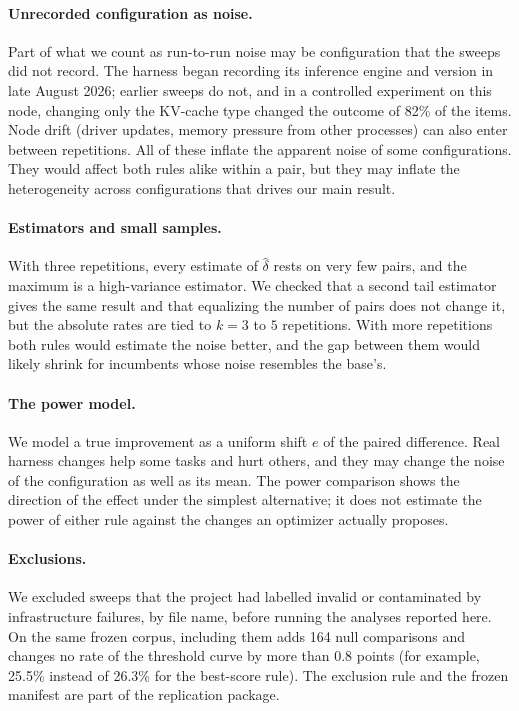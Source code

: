 \paragraph{Unrecorded configuration as noise.}
Part of what we count as run-to-run noise may be configuration that the sweeps
did not record. The harness began recording its inference engine and version in
late August 2026; earlier sweeps do not, and in a controlled experiment on this
node, changing only the KV-cache type changed the outcome of 82\% of the items.
Node drift (driver updates, memory pressure from other processes) can also enter
between repetitions. All of these inflate the apparent noise of some
configurations. They would affect both rules alike within a pair, but they may
inflate the heterogeneity across configurations that drives our main result.

\paragraph{Estimators and small samples.}
With three repetitions, every estimate of $\hat\delta$ rests on very few pairs,
and the maximum is a high-variance estimator. We checked that a second tail
estimator gives the same result and that equalizing the number of pairs does not
change it, but the absolute rates are tied to $k = 3$ to $5$ repetitions. With
more repetitions both rules would estimate the noise better, and the gap between
them would likely shrink for incumbents whose noise resembles the base's.

\paragraph{The power model.}
We model a true improvement as a uniform shift $e$ of the paired difference.
Real harness changes help some tasks and hurt others, and they may change the
noise of the configuration as well as its mean. The power comparison shows the
direction of the effect under the simplest alternative; it does not estimate the
power of either rule against the changes an optimizer actually proposes.

\paragraph{Exclusions.}
We excluded sweeps that the project had labelled invalid or contaminated by
infrastructure failures, by file name, before running the analyses reported
here. On the same frozen corpus, including them adds 164 null comparisons and changes no rate of the threshold curve by more than 0.8 points (for example, 25.5\% instead of 26.3\% for the best-score rule). The exclusion rule and the frozen
manifest are part of the replication package.
